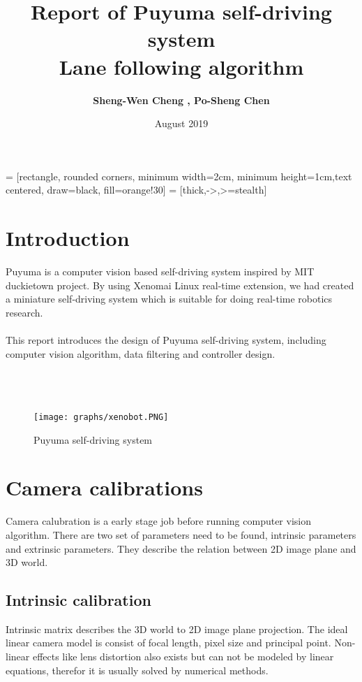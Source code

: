\documentclass{article}
\title{Report of Puyuma self-driving system\\  Lane following algorithm}
\author{\textbf{Sheng-Wen Cheng , Po-Sheng Chen}}
\date{August 2019}
\begin{document}
\maketitle

 = [rectangle, rounded corners, minimum width=2cm, minimum height=1cm,text centered, draw=black, fill=orange!30]
 = [thick,->,>=stealth]

\section{Introduction}
Puyuma is a computer vision based self-driving system inspired by MIT duckietown project. By using Xenomai Linux real-time extension, we had created a miniature self-driving system which is suitable for doing real-time robotics research.
\\
\\
This report introduces the design of Puyuma self-driving system, including computer vision algorithm, data filtering and controller design.
\\
\\
\\
\\

\begin{figure}[ht]
  \label{fig:xenobot}
  \centering
  \texttt{[image: graphs/xenobot.PNG]}
  \caption{Puyuma self-driving system}
\end{figure}

\clearpage

\section{Camera calibrations}

Camera calubration is a early stage job before running computer vision algorithm. There are two set of parameters need to be found, intrinsic parameters and extrinsic parameters. They describe the relation between 2D image plane and 3D world. 

\subsection{Intrinsic calibration}

Intrinsic matrix describes the 3D world to 2D image plane projection. The ideal linear camera model is consist of focal length, pixel size and principal point. Non-linear effects like lens distortion also exists but can not be modeled by linear equations, therefor it is usually solved by numerical methods.
\end{document}
